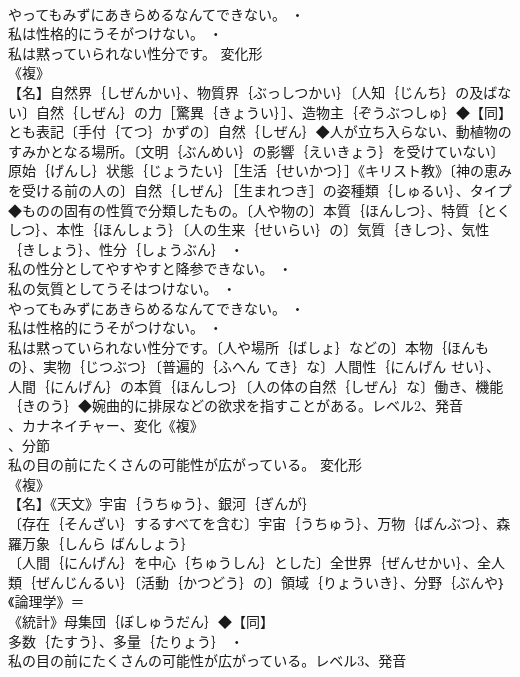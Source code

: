 \documentclass[8pt]{extreport}
\begin{document}
\begin{CJK}{UTF8}{min}
\\	やってもみずにあきらめるなんてできない。 ・
\\	私は性格的にうそがつけない。 ・
\\	私は黙っていられない性分です。	変化形 
\\	《複》
\\	【名】自然界｛しぜんかい｝、物質界｛ぶっしつかい｝〔人知｛じんち｝の及ばない〕自然｛しぜん｝の力［驚異｛きょうい｝］、造物主｛ぞうぶつしゅ｝◆【同】
\\	とも表記〔手付｛てつ｝かずの〕自然｛しぜん｝◆人が立ち入らない、動植物のすみかとなる場所。〔文明｛ぶんめい｝の影響｛えいきょう｝を受けていない〕原始｛げんし｝状態｛じょうたい｝［生活｛せいかつ｝］《キリスト教》〔神の恵みを受ける前の人の〕自然｛しぜん｝［生まれつき］の姿種類｛しゅるい｝、タイプ◆ものの固有の性質で分類したもの。〔人や物の〕本質｛ほんしつ｝、特質｛とくしつ｝、本性｛ほんしょう｝〔人の生来｛せいらい｝の〕気質｛きしつ｝、気性｛きしょう｝、性分｛しょうぶん｝ ・
\\	私の性分としてやすやすと降参できない。 ・
\\	私の気質としてうそはつけない。 ・
\\	やってもみずにあきらめるなんてできない。 ・
\\	私は性格的にうそがつけない。 ・
\\	私は黙っていられない性分です。〔人や場所｛ばしょ｝などの〕本物｛ほんもの｝、実物｛じつぶつ｝〔普遍的｛ふへん てき｝な〕人間性｛にんげん せい｝、人間｛にんげん｝の本質｛ほんしつ｝〔人の体の自然｛しぜん｝な〕働き、機能｛きのう｝◆婉曲的に排尿などの欲求を指すことがある。レベル2、発音
\\	、カナネイチャー、変化《複》
\\	、分節
\\	私の目の前にたくさんの可能性が広がっている。	変化形 
\\	《複》
\\	【名】《天文》宇宙｛うちゅう｝、銀河｛ぎんが｝
\\	〔存在｛そんざい｝するすべてを含む〕宇宙｛うちゅう｝、万物｛ばんぶつ｝、森羅万象｛しんら ばんしょう｝
\\	〔人間｛にんげん｝を中心｛ちゅうしん｝とした〕全世界｛ぜんせかい｝、全人類｛ぜんじんるい｝〔活動｛かつどう｝の〕領域｛りょういき｝、分野｛ぶんや｝《論理学》＝
\\	《統計》母集団｛ぼしゅうだん｝◆【同】
\\	多数｛たすう｝、多量｛たりょう｝ ・
\\	私の目の前にたくさんの可能性が広がっている。レベル3、発音

\end{CJK}
\end{document}

